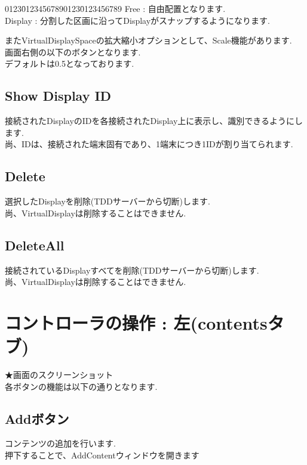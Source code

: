 \documentclass[a4paper,10pt,oneside]{jsbook}
\begin{document}
\begin{tabbing}
0123\=01234567890123\=0123456789\kill
\>Free    \> : 自由配置となります.\\
\>Display \> : 分割した区画に沿ってDisplayがスナップするようになります.
\end{tabbing}

またVirtualDisplaySpaceの拡大縮小オプションとして、Scale機能があります.\\
画面右側の以下のボタンとなります.\\
デフォルトは0.5となっております.\\

\subsection{Show Display ID}
接続されたDisplayのIDを各接続されたDisplay上に表示し、識別できるようにします.\\
尚、IDは、接続された端末固有であり、1端末につき1IDが割り当てられます.\\

\subsection{Delete}
選択したDisplayを削除(TDDサーバーから切断)します.\\
尚、VirtualDisplayは削除することはできません.\\



\subsection{DeleteAll}
接続されているDisplayすべてを削除(TDDサーバーから切断)します.\\
尚、VirtualDisplayは削除することはできません.\\

\newpage

\section{コントローラの操作 : 左(contentsタブ)}

★画面のスクリーンショット\\

各ボタンの機能は以下の通りとなります.\\

\subsection{Addボタン}
コンテンツの追加を行います.\\
押下することで、AddContentウィンドウを開きます
\end{document}

